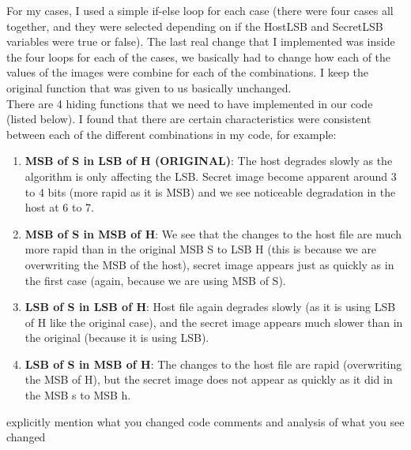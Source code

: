 \documentclass[10pt]{article}
\begin{document}
 For my cases, I used a simple if-else loop for each case  (there were four cases all together, and they were selected depending on if the HostLSB and SecretLSB variables were true or false). The last real change that I implemented was inside the four loops for each of the cases, we basically had to change how each of the values of the images were combine for each of the combinations. I keep the original function that was given to us basically unchanged.\\
 \newline
 There are 4 hiding functions that we need to have implemented in our code (listed below). I found that there are certain characteristics were consistent between each of the different combinations in my code, for example: 
 \begin{enumerate}
 	\item \textbf{MSB of S in LSB of H (ORIGINAL)}: The host degrades slowly as the algorithm is only affecting the LSB. Secret image become apparent around 3 to 4 bits (more rapid as it is MSB) and we see noticeable degradation in the host at 6 to 7. 
 	\item \textbf{MSB of S in MSB of H}: We see that the changes to the host file are much more rapid than in the original MSB S to LSB H (this is because we are overwriting the MSB of the host), secret image appears just as quickly as in the first case (again, because we are using MSB of S).
 	\item \textbf{LSB of S in LSB of H}: Host file again degrades slowly (as it is using LSB of H like the original case), and the secret image appears much slower than in the original (because it is using LSB).
 	\item \textbf{LSB of S in MSB of H}: The changes to the host file are rapid (overwriting the MSB of H), but the secret image does not appear as quickly as it did in the MSB s to MSB h.
\end{enumerate}

\vspace{0.2in} 

explicitly mention what you changed
code comments
and analysis of what you see changed
\end{document}
